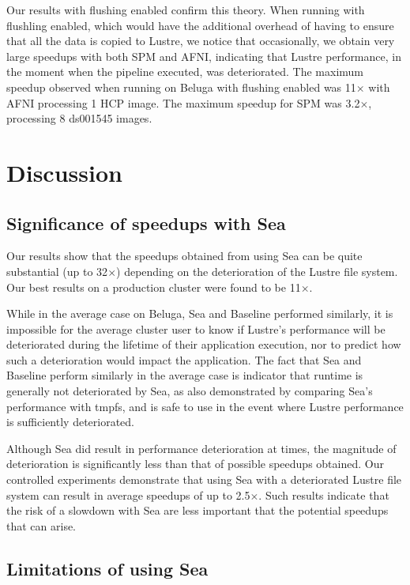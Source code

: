   Our results with flushing enabled confirm this theory. When running with flushling enabled,
  which would have the additional overhead of having to ensure that all the data is copied to
  Lustre, we notice that occasionally, we obtain very large speedups with both SPM 
  and AFNI, indicating that Lustre performance, in the moment when the pipeline executed, was deteriorated.
  The maximum speedup observed when running on Beluga with flushing enabled was 11$\times$ with AFNI 
  processing 1 HCP image. The maximum speedup for SPM was 3.2$\times$, processing 8 ds001545 images.

    
    \section{Discussion}
    \subsection{Significance of speedups with Sea}

    Our results show that the speedups obtained from
    using Sea can be quite substantial (up to 32$\times$)
    depending on the deterioration of the Lustre
    file system. Our best results on a production cluster were found to be
    11$\times$.

    While in the average case on Beluga, Sea and Baseline performed similarly, it is
    impossible for the average cluster user to know if Lustre's performance will
    be deteriorated during the lifetime of their application execution,
    nor to predict how such a deterioration would impact the
    application. The fact that Sea and Baseline perform similarly in the
    average case is indicator that runtime is generally not deteriorated by Sea,
    as also demonstrated by comparing Sea's performance with tmpfs, 
    and is safe to use in the event where Lustre performance is sufficiently
    deteriorated.

    Although Sea did result in performance deterioration at times, the
    magnitude of deterioration is significantly less than that of possible
    speedups obtained. Our controlled experiments demonstrate that using
    Sea with a deteriorated Lustre file system can result in average
    speedups of up to 2.5$\times$. Such results indicate that the risk of a
    slowdown with Sea are less important that the potential speedups that
    can arise.

    \subsection{Limitations of using Sea}
    
